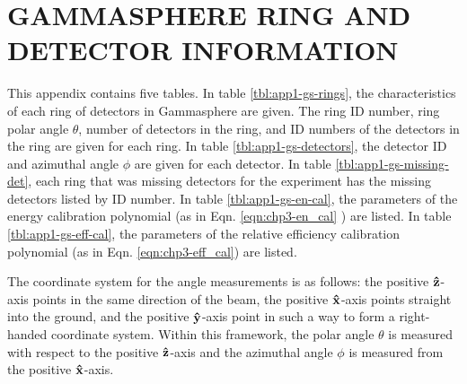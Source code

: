%
%

\chapter{GAMMASPHERE RING AND DETECTOR INFORMATION}
\label{app:gs-rings-and-detectors}
This appendix contains five tables. In table \ref{tbl:app1-gs-rings}, the characteristics of each ring of detectors in Gammasphere are given. The ring ID number, ring polar angle $\theta$, number of detectors in the ring, and ID numbers of the detectors in the ring are given for each ring. In table \ref{tbl:app1-gs-detectors}, the detector ID and azimuthal angle $\phi$ are given for each detector. In table \ref{tbl:app1-gs-missing-det}, each ring that was missing detectors for the experiment has the missing detectors listed by ID number. In table \ref{tbl:app1-gs-en-cal}, the parameters of the energy calibration polynomial (as in Eqn. \ref{eqn:chp3-en_cal} ) are listed. In table \ref{tbl:app1-gs-eff-cal}, the parameters of the relative efficiency calibration polynomial (as in Eqn. \ref{eqn:chp3-eff_cal}) are listed.

The coordinate system for the angle measurements is as follows: the positive $\boldsymbol{\hat{\textbf{z}}}$-axis points in the same direction of the beam, the positive $\boldsymbol{\hat{\textbf{x}}}$-axis points straight into the ground, and the positive $\boldsymbol{\hat{\textbf{y}}}$-axis point in such a way to form a right-handed coordinate system. Within this framework, the polar angle $\theta$ is measured with respect to the positive $\boldsymbol{\hat{\textbf{z}}}$-axis and the azimuthal angle $\phi$ is measured from the positive $\boldsymbol{\hat{\textbf{x}}}$-axis.



